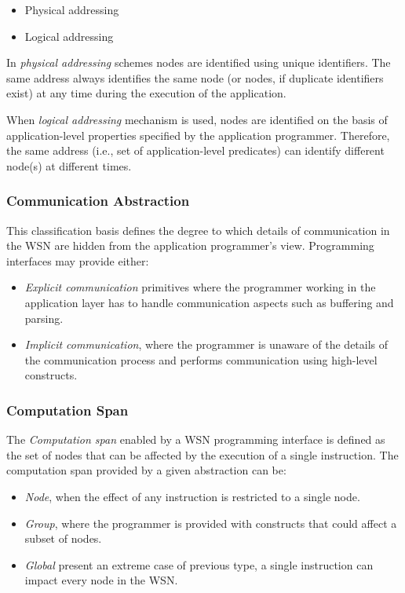 \begin{itemize}
  \item Physical addressing
  \item Logical addressing
\end{itemize}

In \emph{physical addressing} schemes nodes are identified using unique 
  identifiers. The same address always identifies the same node (or nodes, if
  duplicate  identifiers exist) at any time during the execution of the
  application.

When \emph{logical addressing} mechanism is used, nodes are identified on the
basis of application-level properties specified by the application
programmer. Therefore, the same address (i.e., set of
application-level predicates) can identify different node(s) at different
times.

\subsubsection{Communication Abstraction}

This classification basis defines the degree to which details of communication
in the WSN are hidden from the application programmer's view. Programming
interfaces may provide either:

\begin{itemize}
  \item \emph{Explicit communication} primitives where the
  programmer working in the application layer has to handle communication
  aspects such as buffering and parsing.
  \item \emph{Implicit communication}, where the programmer is unaware of the
  details of the communication process and performs communication using
  high-level constructs.
\end{itemize}

\subsubsection{Computation Span}

The \emph{Computation span} enabled by a WSN programming interface is defined
as the set of nodes that can be affected by the execution of a single
instruction. The
computation span provided by a given abstraction can be:

\begin{itemize}
  \item \emph{Node}, when the effect of any instruction is restricted to a
  single node.
  \item \emph{Group}, where the programmer is provided with constructs that
  could affect a subset of nodes. 
  \item \emph{Global} present an extreme case of previous type, a single
  instruction can impact every node in the WSN.
\end{itemize}


